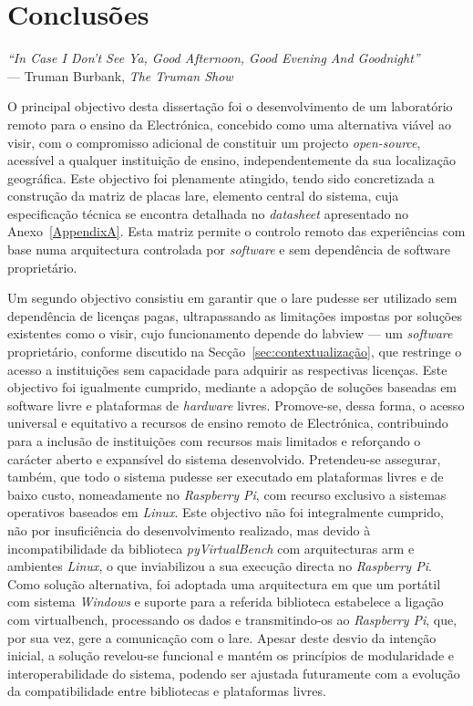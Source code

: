 \chapter{Conclusões}
\label{Capítulo6}
\begin{flushright}
\textit{``In Case I Don't See Ya, Good Afternoon, Good Evening And Goodnight''} \\[0.5em]
--- Truman Burbank, \textit{The Truman Show}
\end{flushright}
O principal objectivo desta dissertação foi o desenvolvimento de um laboratório remoto para o ensino da Electrónica, concebido como uma alternativa viável ao \acrshort{visir}, com o compromisso adicional de constituir um projecto \textit{open-source}, acessível a qualquer instituição de ensino, independentemente da sua localização geográfica. Este objectivo foi plenamente atingido, tendo sido concretizada a construção da matriz de placas \acrshort{lare}, elemento central do sistema, cuja especificação técnica se encontra detalhada no \textit{datasheet} apresentado no Anexo~\ref{AppendixA}. Esta matriz permite o controlo remoto das experiências com base numa arquitectura controlada por \textit{software} e sem dependência de software proprietário.

Um segundo objectivo consistiu em garantir que o \acrshort{lare} pudesse ser utilizado sem dependência de licenças pagas, ultrapassando as limitações impostas por soluções existentes como o \acrshort{visir}, cujo funcionamento depende do \acrshort{labview} — um \textit{software} proprietário, conforme discutido na Secção~\ref{sec:contextualização}, que restringe o acesso a instituições sem capacidade para adquirir as respectivas licenças. Este objectivo foi igualmente cumprido, mediante a adopção de soluções baseadas em software livre e plataformas de \textit{hardware} livres. Promove-se, dessa forma, o acesso universal e equitativo a recursos de ensino remoto de Electrónica, contribuindo para a inclusão de instituições com recursos mais limitados e reforçando o carácter aberto e expansível do sistema desenvolvido. Pretendeu-se assegurar, também, que todo o sistema pudesse ser executado em plataformas livres e de baixo custo, nomeadamente no \textit{Raspberry Pi}, com recurso exclusivo a sistemas operativos baseados em \textit{Linux}. Este objectivo não foi integralmente cumprido, não por insuficiência do desenvolvimento realizado, mas devido à incompatibilidade da biblioteca \textit{pyVirtualBench} com arquitecturas \acrshort{arm} e ambientes \textit{Linux}, o que inviabilizou a sua execução directa no \textit{Raspberry Pi}. Como solução alternativa, foi adoptada uma arquitectura em que um portátil com sistema \textit{Windows} e suporte para a referida biblioteca estabelece a ligação com \acrshort{virtualbench}, processando os dados e transmitindo-os ao \textit{Raspberry Pi}, que, por sua vez, gere a comunicação com o \acrshort{lare}. Apesar deste desvio da intenção inicial, a solução revelou-se funcional e mantém os princípios de modularidade e interoperabilidade do sistema, podendo ser ajustada futuramente com a evolução da compatibilidade entre bibliotecas e plataformas livres.

